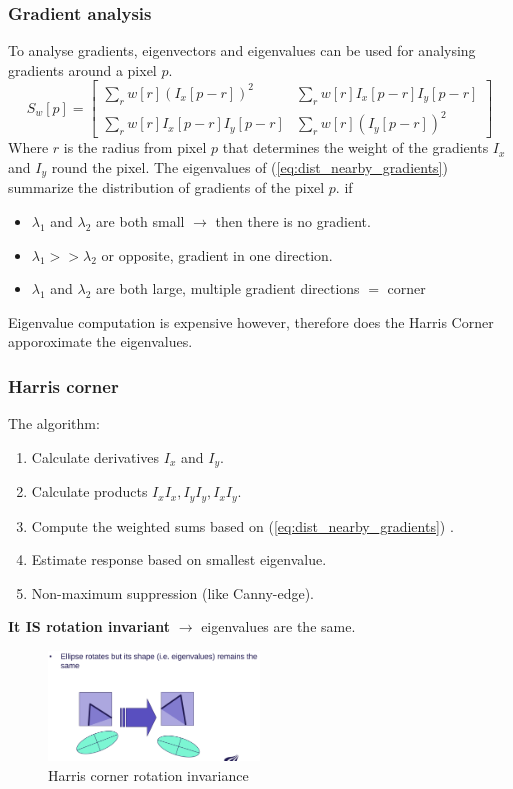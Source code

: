 \documentclass[a4paper]{article}
\begin{document}
\subsubsection{Gradient analysis}
To analyse gradients, eigenvectors and eigenvalues can be used for analysing gradients around a pixel $ p $. 
 \begin{equation}\label{eq:dist_nearby_gradients}
	 S_w[p] = \begin{bmatrix}
		 \sum_{r}w[r](I_x[p-r])^{2} & \sum_{r}w[r]I_x[p-r] I_y[p-r] \\
	  \sum_{r}w[r]I_x[p-r] I_y[p-r] & \sum_{r}w[r](I_y[p-r])^{2}
	 \end{bmatrix}
\end{equation}
Where $ r $ is the radius from pixel  $ p $ that determines the weight of the gradients $ I_x $ and $ I_y $ round the pixel. The eigenvalues of (\ref{eq:dist_nearby_gradients}) summarize the distribution of gradients of the pixel $ p $. 
if
\begin{itemize}
	\item $ \lambda_1 $ and $ \lambda_2 $ are both small  $ \rightarrow  $ then there is no gradient.
	\item $ \lambda_1 >> \lambda_2 $ or opposite, gradient in one direction.
	\item $ \lambda_1 $ and $ \lambda_2 $ are both large, multiple gradient directions $ = $ corner
\end{itemize}

Eigenvalue computation is expensive however, therefore does the Harris Corner apporoximate the eigenvalues.


\subsubsection{Harris corner}
The algorithm:
\begin{enumerate}
	\item Calculate derivatives $ I_x $ and $ I_y $.
	\item Calculate products $ I_xI_x, I_yI_y, I_xI_y$.
	\item Compute the weighted sums based on  (\ref{eq:dist_nearby_gradients}) .
	\item Estimate response based on smallest eigenvalue.
	\item Non-maximum suppression (like Canny-edge).
\end{enumerate}
\textbf{It IS rotation invariant} $\rightarrow $ eigenvalues are the same.

\begin{figure}[H]
\centering
\includegraphics[width=0.5\textwidth]{figures/harris_rotation.png}
\caption{Harris corner rotation invariance}
\label{fig:harris_rot_invariance}
\end{figure} 
\end{document}
